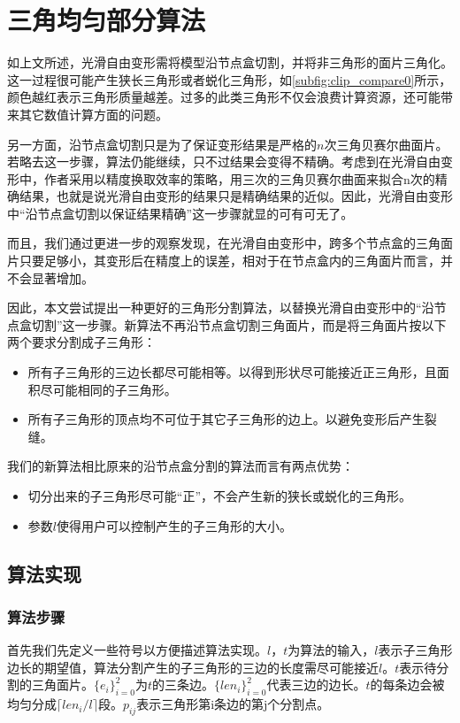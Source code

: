 
\chapter{三角均匀部分算法}
如上文所述，光滑自由变形需将模型沿节点盒切割，并将非三角形的面片三角化。这一过程很可能产生狭长三角形或者蜕化三角形，如\autoref{subfig:clip_compare0}所示，颜色越红表示三角形质量越差。过多的此类三角形不仅会浪费计算资源，还可能带来其它数值计算方面的问题。

另一方面，沿节点盒切割只是为了保证变形结果是严格的$n$次三角贝赛尔曲面片。若略去这一步骤，算法仍能继续，只不过结果会变得不精确。考虑到在光滑自由变形中，作者采用以精度换取效率的策略，用三次的三角贝赛尔曲面来拟合n次的精确结果，也就是说光滑自由变形的结果只是精确结果的近似。因此，光滑自由变形中“沿节点盒切割以保证结果精确”这一步骤就显的可有可无了。

而且，我们通过更进一步的观察发现，在光滑自由变形中，跨多个节点盒的三角面片只要足够小，其变形后在精度上的误差，相对于在节点盒内的三角面片而言，并不会显著增加。

因此，本文尝试提出一种更好的三角形分割算法，以替换光滑自由变形中的“沿节点盒切割”这一步骤。新算法不再沿节点盒切割三角面片，而是将三角面片按以下两个要求分割成子三角形：
\begin{itemize}
    \item 所有子三角形的三边长都尽可能相等。以得到形状尽可能接近正三角形，且面积尽可能相同的子三角形。
    \item 所有子三角形的顶点均不可位于其它子三角形的边上。以避免变形后产生裂缝。
\end{itemize}

我们的新算法相比原来的沿节点盒分割的算法而言有两点优势：
\begin{itemize}
        \item 切分出来的子三角形尽可能“正”，不会产生新的狭长或蜕化的三角形。
        \item 参数$l$使得用户可以控制产生的子三角形的大小。
\end{itemize}


\section{算法实现}
\subsection{算法步骤}
首先我们先定义一些符号以方便描述算法实现。$l$，$t$为算法的输入，$l$表示子三角形边长的期望值，算法分割产生的子三角形的三边的长度需尽可能接近$l$。$t$表示待分割的三角面片。$\{e_i\}^{2}_{i=0}$为$t$的三条边。$\{len_i\}^{2}_{i=0}$代表三边的边长。$t$的每条边会被均匀分成$\lceil len_i/l \rceil$段。$p_{ij}$表示三角形第i条边的第j个分割点。


